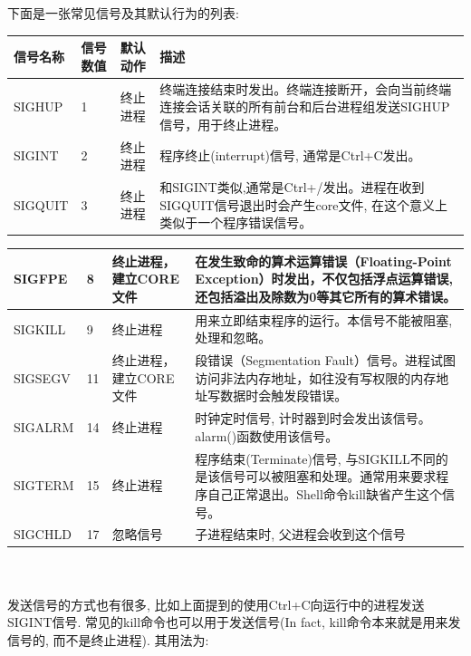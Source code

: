 \documentclass[a4paper]{ctexart}
\begin{document}
下面是一张常见信号及其默认行为的列表:
\begin{table}[ht]
\small
\begin{tabularx}{\textwidth}{|p{2cm}|p{1cm}|p{2cm}|X|}
      \hline
      \textbf{信号名称} & \textbf{信号数值} & \textbf{默认动作} & \textbf{描述}\\
      \hline
      SIGHUP & 1 & 终止进程 & 终端连接结束时发出。终端连接断开，会向当前终端连接会话关联的所有前台和后台进程组发送SIGHUP信号，用于终止进程。\\
      \hline
      SIGINT & 2 & 终止进程 & 程序终止(interrupt)信号, 通常是Ctrl+C发出。\\
      \hline
      SIGQUIT & 3 & 终止进程 & 和SIGINT类似,通常是Ctrl+/发出。进程在收到SIGQUIT信号退出时会产生core文件, 在这个意义上类似于一个程序错误信号。\\
      \hline
\end{tabularx}
\end{table}
\begin{table}[ht]
\small
\begin{tabularx}{\textwidth}{|p{2cm}|p{1cm}|p{2cm}|X|}
      \hline 
      SIGFPE & 8 & 终止进程，建立CORE文件 & 在发生致命的算术运算错误（Floating-Point Exception）时发出，不仅包括浮点运算错误, 还包括溢出及除数为0等其它所有的算术错误。\\
      \hline 
      SIGKILL & 9 & 终止进程 & 用来立即结束程序的运行。本信号不能被阻塞, 处理和忽略。\\
      \hline 
      SIGSEGV & 11 & 终止进程，建立CORE文件 & 段错误（Segmentation Fault）信号。进程试图访问非法内存地址，如往没有写权限的内存地址写数据时会触发段错误。\\
      \hline
      SIGALRM & 14 & 终止进程 & 时钟定时信号, 计时器到时会发出该信号。alarm()函数使用该信号。\\
      \hline
      SIGTERM & 15 & 终止进程 & 程序结束(Terminate)信号, 与SIGKILL不同的是该信号可以被阻塞和处理。通常用来要求程序自己正常退出。Shell命令kill缺省产生这个信号。\\
      \hline
      SIGCHLD & 17 & 忽略信号 & 子进程结束时, 父进程会收到这个信号\\
      \hline
\end{tabularx}
\end{table}
\\\\

发送信号的方式也有很多, 比如上面提到的使用Ctrl+C向运行中的进程发送SIGINT信号. 常见的kill命令也可以用于发送信号(In fact, kill命令本来就是用来发信号的, 而不是终止进程). 其用法为:
\end{document}
